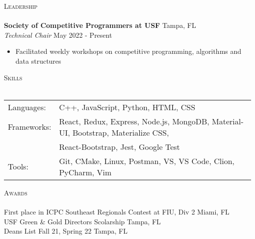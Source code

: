 \documentclass[a4paper]{article}
\newcommand{\lineunder} {
    \vspace*{-8pt} \\
    \hspace*{-18pt} \hrulefill \\
}
\newcommand{\header} [1] {
    {\hspace*{-18pt}\vspace*{6pt} \textsc{#1}}
    \vspace*{-6pt} \lineunder
}
\begin{document}
{\Large \header{Leadership}}
\vspace{1mm}
\textbf{Society of Competitive Programmers at USF} \hfill Tampa, FL\\
\textit{Technical Chair} \hfill May 2022 - Present\\
\vspace{-1mm}
\begin{itemize} \itemsep 1pt
    \item Facilitated weekly workshops on competitive programming, algorithms and data structures
\end{itemize}
{\Large \header{Skills}}
\vspace{1mm}
\begin{tabular}{ l l }
	Languages:  & C++, JavaScript, Python, HTML, CSS                                                 \\
	Frameworks: & React, Redux, Express, Node.js, MongoDB, Material-UI, Bootstrap, Materialize CSS,  \\
	            & React-Bootstrap, Jest, Google Test \\
	Tools:      & Git, CMake, Linux, Postman, VS, VS Code, Clion, PyCharm, Vim                                                 \\
\end{tabular}
\vspace{2mm}

{\Large \header{Awards}}
First place in ICPC Southeast Regionals Contest at FIU, Div 2 \hfill Miami, FL\\
USF Green \& Gold Directors Scolarship \hfill Tampa, FL\\
Dean\textquotesingle{}s List Fall 21, Spring 22 \hfill Tampa, FL\\
\ 
\end{document}
